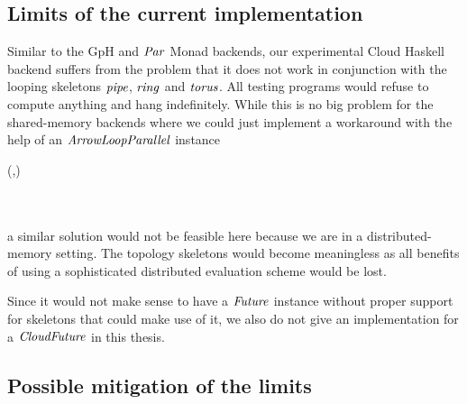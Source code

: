 \documentclass[paper=A4,twoside=true,openright,parskip=full,chapterprefix=true,headings=normal,bibliography=totoc,listof=totoc,titlepage=on,captions=tableabove,draft=false,british]{scrreprt}%
\begin{document}
\hypertarget{limits-of-the-current-implementation}{%
\subsection{Limits of the current
implementation}\label{limits-of-the-current-implementation}}

\label{sec:CloudHaskellArrowParallelLimits}

Similar to the GpH and \ensuremath{\Conid{Par}} Monad backends, our experimental Cloud
Haskell backend suffers from the problem that it does not work in
conjunction with the looping skeletons \ensuremath{\Varid{pipe}}, \ensuremath{\Varid{ring}} and \ensuremath{\Varid{torus}}. All
testing programs would refuse to compute anything and hang indefinitely.
While this is no big problem for the shared-memory backends where we
could just implement a workaround with the help of an
\ensuremath{\Conid{ArrowLoopParallel}} instance


\begin{hscode}\SaveRestoreHook
{}%
%
%
\>[B]{}\;(\;,\;\;\;\;)\Rightarrow {}\<[E]%
\\
\>[B]{}\<[5]%
\>[5]{}\;\;\;\;\;\<[E]%
\\
\>[B]{}\<[5]%
\>[5]{}\;\anonymous \mathrel{=}\<[E]%
\\
\>[B]{}\<[5]%
\>[5]{}\mathrel{=}\<[E]%
\ColumnHook
\end{hscode}\resethooks
\vspace{-2\baselineskip}

a similar solution would not be feasible here because we are in a
distributed-memory setting. The topology skeletons would become
meaningless as all benefits of using a sophisticated distributed
evaluation scheme would be lost.

Since it would not make sense to have a \ensuremath{\Conid{Future}} instance without proper
support for skeletons that could make use of it, we also do not give an
implementation for a \ensuremath{\Conid{CloudFuture}} in this thesis.

\hypertarget{possible-mitigation-of-the-limits}{%
\subsection{Possible mitigation of the
limits}\label{possible-mitigation-of-the-limits}}
\end{document}
